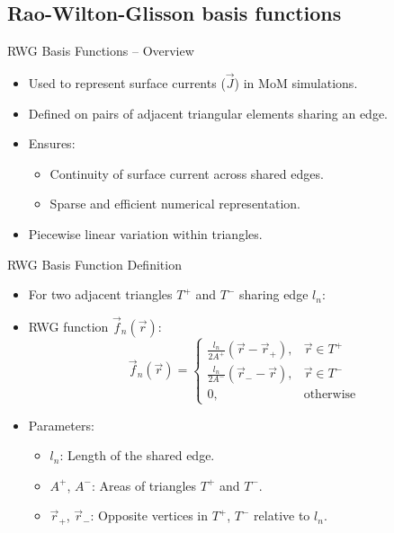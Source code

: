 \subsection{Rao-Wilton-Glisson basis functions}
\begin{frame}{RWG Basis Functions – Overview}
    \begin{itemize}
        \item Used to represent surface currents (\(\vec{J}\)) in MoM simulations.
        \item Defined on pairs of adjacent triangular elements sharing an edge.
        \item Ensures:
            \begin{itemize}
                \item Continuity of surface current across shared edges.
                \item Sparse and efficient numerical representation.
            \end{itemize}
        \item Piecewise linear variation within triangles.
    \end{itemize}
\end{frame}

\begin{frame}{RWG Basis Function Definition}
    \begin{itemize}
        \item For two adjacent triangles \(T^+\) and \(T^-\) sharing edge \(l_n\):
        \item RWG function \(\vec{f}_n(\vec{r})\):
            \[
            \vec{f}_n(\vec{r}) =
            \begin{cases}
            \frac{l_n}{2A^+} (\vec{r} - \vec{r}_+), & \vec{r} \in T^+ \\
            \frac{l_n}{2A^-} (\vec{r}_- - \vec{r}), & \vec{r} \in T^- \\
            0, & \text{otherwise}
            \end{cases} \tag{1}
            \]
        \item Parameters:
            \begin{itemize}
                \item \(l_n\): Length of the shared edge.
                \item \(A^+\), \(A^-\): Areas of triangles \(T^+\) and \(T^-\).
                \item \(\vec{r}_+\), \(\vec{r}_-\): Opposite vertices in \(T^+\), \(T^-\) relative to \(l_n\).
            \end{itemize}
    \end{itemize}
\end{frame}

